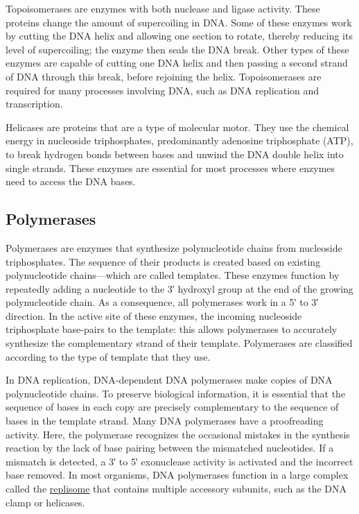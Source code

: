 Topoisomerases are enzymes with both nuclease and ligase activity. These proteins change the amount of supercoiling in DNA. Some of these enzymes work by cutting the DNA helix and allowing one section to rotate, thereby reducing its level of supercoiling; the enzyme then seals the DNA break. Other types of these enzymes are capable of cutting one DNA helix and then passing a second strand of DNA through this break, before rejoining the helix. Topoisomerases are required for many processes involving DNA, such as DNA replication and transcription.

Helicases are proteins that are a type of molecular motor. They use the chemical energy in nucleoside triphosphates, predominantly adenosine triphosphate (ATP), to break hydrogen bonds between bases and unwind the DNA double helix into single strands. These enzymes are essential for most processes where enzymes need to access the DNA bases.

\hypertarget{polymerases}{%
\subsection{Polymerases}\label{polymerases}}

Polymerases are enzymes that synthesize polynucleotide chains from nucleoside triphosphates. The sequence of their products is created based on existing polynucleotide chains---which are called templates. These enzymes function by repeatedly adding a nucleotide to the 3′ hydroxyl group at the end of the growing polynucleotide chain. As a consequence, all polymerases work in a 5′ to 3′ direction. In the active site of these enzymes, the incoming nucleoside triphosphate base-pairs to the template: this allows polymerases to accurately synthesize the complementary strand of their template. Polymerases are classified according to the type of template that they use.

In DNA replication, DNA-dependent DNA polymerases make copies of DNA polynucleotide chains. To preserve biological information, it is essential that the sequence of bases in each copy are precisely complementary to the sequence of bases in the template strand. Many DNA polymerases have a proofreading activity. Here, the polymerase recognizes the occasional mistakes in the synthesis reaction by the lack of base pairing between the mismatched nucleotides. If a mismatch is detected, a 3′ to 5′ exonuclease activity is activated and the incorrect base removed. In most organisms, DNA polymerases function in a large complex called the \href{https://en.wikipedia.org/wiki/Replisome}{replisome} that contains multiple accessory subunits, such as the DNA clamp or helicases.

